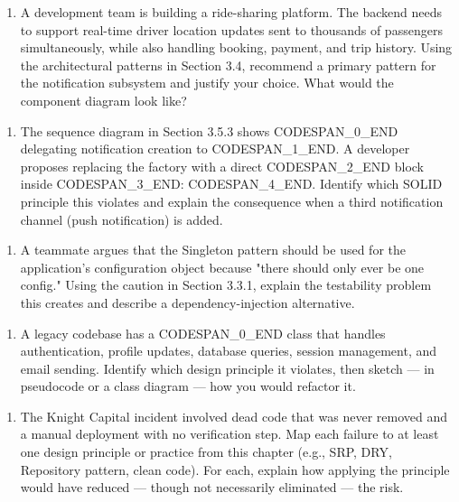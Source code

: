 \documentclass[11pt,a4paper]{book}
\begin{document}
\begin{enumerate}
  \item A development team is building a ride-sharing platform. The backend needs to support real-time driver location updates sent to thousands of passengers simultaneously, while also handling booking, payment, and trip history. Using the architectural patterns in Section 3.4, recommend a primary pattern for the notification subsystem and justify your choice. What would the component diagram look like?
\end{enumerate}

\begin{enumerate}
  \item The sequence diagram in Section 3.5.3 shows CODESPAN\_0\_END delegating notification creation to CODESPAN\_1\_END. A developer proposes replacing the factory with a direct CODESPAN\_2\_END block inside CODESPAN\_3\_END: CODESPAN\_4\_END. Identify which SOLID principle this violates and explain the consequence when a third notification channel (push notification) is added.
\end{enumerate}

\begin{enumerate}
  \item A teammate argues that the Singleton pattern should be used for the application's configuration object because "there should only ever be one config." Using the caution in Section 3.3.1, explain the testability problem this creates and describe a dependency-injection alternative.
\end{enumerate}

\begin{enumerate}
  \item A legacy codebase has a CODESPAN\_0\_END class that handles authentication, profile updates, database queries, session management, and email sending. Identify which design principle it violates, then sketch --- in pseudocode or a class diagram --- how you would refactor it.
\end{enumerate}

\begin{enumerate}
  \item The Knight Capital incident involved dead code that was never removed and a manual deployment with no verification step. Map each failure to at least one design principle or practice from this chapter (e.g., SRP, DRY, Repository pattern, clean code). For each, explain how applying the principle would have reduced --- though not necessarily eliminated --- the risk.
\end{enumerate}
\end{document}
